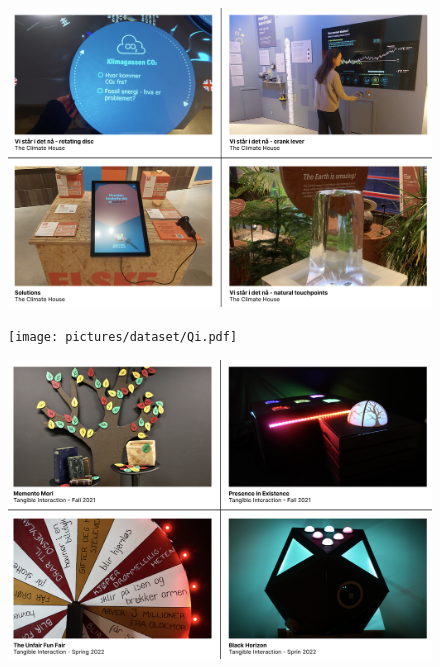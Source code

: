 \begin{figure}[H]
\includegraphics[width=13cm]{pictures/dataset/klimahuset.png}
\centering 
\end{figure}

\begin{figure}[H]
\texttt{[image: pictures/dataset/Qi.pdf]}
\centering 
\end{figure}


\begin{figure}[H]
\includegraphics[width=13cm]{pictures/dataset/tangible.png}
\centering 
\end{figure}

